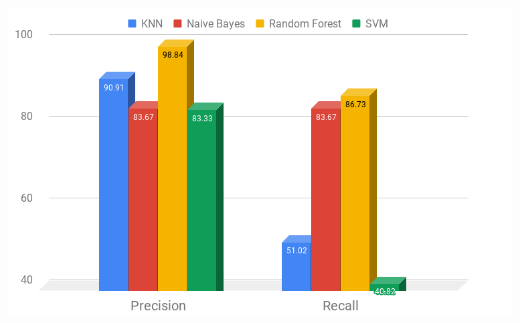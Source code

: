 \documentclass[12pt]{article}
\newenvironment{Figure}
  {\par\medskip\noindent\minipage{\linewidth}}
  {\endminipage\par\medskip}
\begin{document}
        \begin{Figure}
            \centering
            \includegraphics[width=\linewidth]{figures/precision_recall.png}
            \label{fig:precision_recall}
        \end{Figure}
\end{document}
